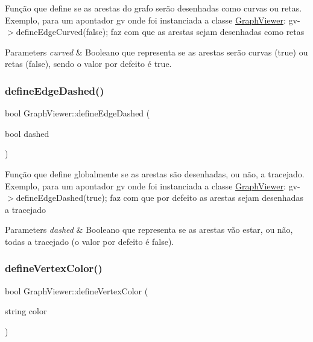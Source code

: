 Função que define se as arestas do grafo serão desenhadas como curvas ou retas. Exemplo, para um apontador gv onde foi instanciada a classe \hyperlink{class_graph_viewer}{Graph\+Viewer}\+: gv-\/$>$define\+Edge\+Curved(false); faz com que as arestas sejam desenhadas como retas


\begin{DoxyParams}{Parameters}
{\em curved} & Booleano que representa se as arestas serão curvas (true) ou retas (false), sendo o valor por defeito é true. \\
\hline
\end{DoxyParams}
\hypertarget{class_graph_viewer_af785279b5c204df0e274b20c36276fc3}{}\label{class_graph_viewer_af785279b5c204df0e274b20c36276fc3} 
\subsubsection{\texorpdfstring{define\+Edge\+Dashed()}{defineEdgeDashed()}}
{\footnotesize\ttfamily bool Graph\+Viewer\+::define\+Edge\+Dashed (\begin{DoxyParamCaption}\item[{bool}]{dashed }\end{DoxyParamCaption})}

Função que define globalmente se as arestas são desenhadas, ou não, a tracejado. Exemplo, para um apontador gv onde foi instanciada a classe \hyperlink{class_graph_viewer}{Graph\+Viewer}\+: gv-\/$>$define\+Edge\+Dashed(true); faz com que por defeito as arestas sejam desenhadas a tracejado


\begin{DoxyParams}{Parameters}
{\em dashed} & Booleano que representa se as arestas vão estar, ou não, todas a tracejado (o valor por defeito é false). \\
\hline
\end{DoxyParams}
\hypertarget{class_graph_viewer_a76de8676b7a93d72af514b84cdaa4d21}{}\label{class_graph_viewer_a76de8676b7a93d72af514b84cdaa4d21} 
\subsubsection{\texorpdfstring{define\+Vertex\+Color()}{defineVertexColor()}}
{\footnotesize\ttfamily bool Graph\+Viewer\+::define\+Vertex\+Color (\begin{DoxyParamCaption}\item[{string}]{color }\end{DoxyParamCaption})}

